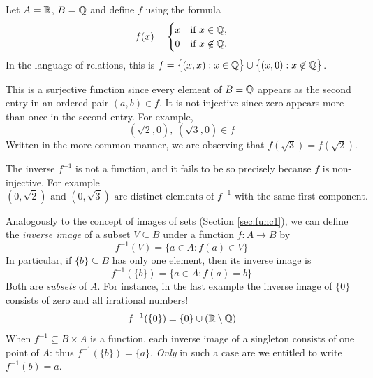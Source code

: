\begin{example}{}{}
	Let $A=\mathbb{R}$, $B=\mathbb{Q}$ and define $f$ using the formula 
	\[
		f(x)=
		\begin{cases}
			x&\text{if }x\in\mathbb{Q},\\
			0&\text{if }x\not\in\mathbb{Q}.
		\end{cases}
	\]
	In the language of relations, this is $f=\bigl\{(x,x):x\in\mathbb{Q}\bigr\}\cup\bigl\{(x,0):x\not\in\mathbb{Q}\bigr\}$.\par
	This is a surjective function since every element of $B=\mathbb{Q}$ appears as the second entry in an ordered pair $(a,b)\in f$. It is not injective since zero appears more than once in the second entry. For example,
	\[
		(\sqrt 2,0),\ (\sqrt 3,0)\in f
	\]
	Written in the more common manner, we are observing that $f(\sqrt 3)=f(\sqrt 2)$.\par
	The inverse $f^{-1}$ is not a function, and it fails to be so precisely because $f$ is non-injective. For example
	\[
		(0,\sqrt 2)\text{ and } (0,\sqrt 3)\text{ are distinct elements of $f^{-1}$ with the same  first component.}
	\]
\end{example}


Analogously to the concept of images of sets (Section \ref{sec:func1}), we can define the \emph{inverse image} of a subset $V\subseteq B$ under a function $f:A\to B$ by
\[
	f^{-1}(V)=\{a\in A:f(a)\in V\}
\]
In particular, if $\{b\}\subseteq B$ has only one element, then its inverse image is
\[
	f^{-1}(\{b\})=\{a\in A:f(a)=b\}
\]
Both are \emph{subsets} of $A$. For instance, in the last example the inverse image of $\{0\}$ consists of zero and all irrational numbers!
\[
	f^{-1}(\{0\})=\{0\}\cup(\mathbb{R}\setminus\mathbb{Q})
\]
When $f^{-1}\subseteq B\times A$ is a function, each inverse image of a singleton consists of one point of $A$: thus $f^{-1}(\{b\})=\{a\}$. \emph{Only} in such a case are we entitled to write $f^{-1}(b)=a$.




